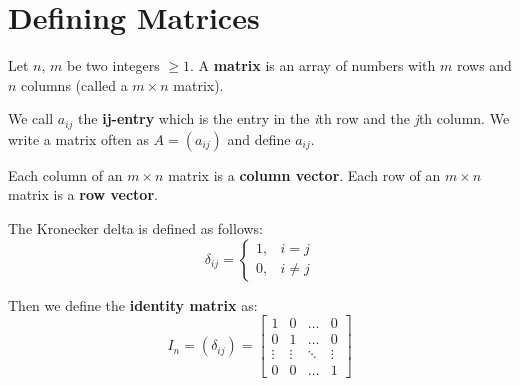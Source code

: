\documentclass[../main.tex]{subfiles}
\begin{document}

\section{Defining Matrices}

Let \( n,\, m \) be two integers \( \geq 1 \).
A \textbf{matrix} is an array of numbers with \( m \) rows and \( n \) columns (called a \( m \times n \) matrix).

We call \textbf{\( a_{ij} \)} the \textbf{ij-entry} which is the entry in the \textit{i}th row and the \textit{j}th column.
We write a matrix often as \( A=(a_{ij}) \) and define \( a_{ij} \).

Each column of an \( m \times n \) matrix is a \textbf{column vector}.
Each row of an \( m \times n \) matrix is a \textbf{row vector}.

\begin{example}
    The Kronecker delta is defined as follows:
    \[
        \delta_{ij} =
        \begin{cases}
            1,& i = j \\
            0,& i \neq j
        \end{cases}
    \]

    Then we define the \textbf{identity matrix} as:
    \[ I_n = (\delta_{ij}) =
        \begin{bmatrix}
            1 & 0 &  \dots  & 0 \\
            0 & 1 & \dots & 0 \\
            \vdots & \vdots & \ddots & \vdots \\
            0 & 0 & \dots  & 1
        \end{bmatrix}
    \]
\end{example}
\end{document}
